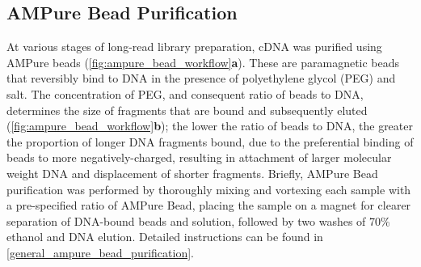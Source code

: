 \subsection{AMPure Bead Purification} 
\label{section:ch2_AMPure_explanation} 
At various stages of long-read library preparation, cDNA was purified using AMPure beads (\cref{fig:ampure_bead_workflow}\textbf{a}). These are paramagnetic beads that reversibly bind to DNA in the presence of polyethylene glycol (PEG) and salt. The concentration of PEG, and consequent ratio of beads to DNA, determines the size of fragments that are bound and subsequently eluted (\cref{fig:ampure_bead_workflow}\textbf{b}); the lower the ratio of beads to DNA, the greater the proportion of longer DNA fragments bound, due to the preferential binding of beads to more negatively-charged, resulting in attachment of larger molecular weight DNA and displacement of shorter fragments. Briefly, AMPure Bead purification was performed by thoroughly mixing and vortexing each sample with a pre-specified ratio of AMPure Bead, placing the sample on a magnet for clearer separation of DNA-bound beads and solution, followed by two washes of 70\% ethanol and DNA elution. Detailed instructions can be found in \cref{general_ampure_bead_purification}.

